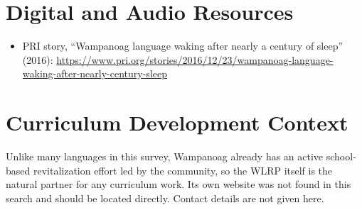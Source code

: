 \documentclass[12pt]{article}
\begin{document}
\section{Digital and Audio Resources}
\begin{itemize}
\item PRI story, ``Wampanoag language waking after nearly a century of sleep'' (2016): \url{https://www.pri.org/stories/2016/12/23/wampanoag-language-waking-after-nearly-century-sleep}
\end{itemize}

\section{Curriculum Development Context}
Unlike many languages in this survey, Wampanoag already has an active school-based revitalization effort led by the community, so the WLRP itself is the natural partner for any curriculum work. Its own website was not found in this search and should be located directly. Contact details are not given here.
\end{document}
